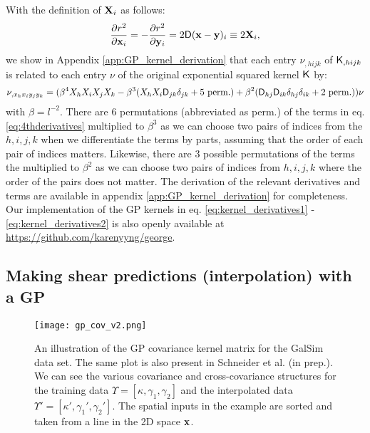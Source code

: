 With the definition of ${\bf X}_i$ as follows:
\begin{equation}
	\frac{\partial r^2}{\partial \mathbf{x}_i} = -\frac{\partial
	r^2}{\partial \mathbf{y}_i} =
	2 \mathsf{D}(\mathbf{x} - \mathbf{y})_i \equiv 2{\bf X}_i,
\end{equation}
we show in Appendix \ref{app:GP_kernel_derivation} 
that each entry $\nu_{,hijk}$ of $\mathsf{K}_{,hijk}$ is
related to each entry $\nu$ of the original exponential squared kernel
$\mathsf{K}$ by:
\begin{equation}
\nu_{,x_h x_i y_j y_k} = (\beta^4 X_h X_i X_j X_k -
\beta^3 (X_h X_i \mathsf{D}_{jk} \delta_{jk} + 5~{\rm perm.}) + \beta^2
(\mathsf{D}_{hj} \mathsf{D}_{ik}\delta_{hj}\delta_{ik} + 2~{\rm perm.})) \nu
\label{eq:4thderivatives}
\end{equation}
with $\beta = l^{-2}$. There are 6 permutations (abbreviated as perm.) of the terms in
eq. \ref{eq:4thderivatives}
multiplied to $\beta^3$ as we can choose two pairs of indices from the $h,i,j,k$ 
when we differentiate the terms by parts, assuming that the order of each
pair of indices matters. 
Likewise, there are 3 possible permutations of
the terms the multiplied to $\beta^2$ as we can choose two pairs of indices from
$h, i, j, k$ where the order of the pairs does not matter.
The derivation of the relevant derivatives and terms are available 
in appendix \ref{app:GP_kernel_derivation} for completeness. 
Our implementation of the GP kernels in eq. \ref{eq:kernel_derivatives1} - 
\ref{eq:kernel_derivatives2} is also openly available at
\href{https://github.com/karenyyng/george}{https://github.com/karenyyng/george}.


\subsection{Making shear predictions (interpolation) with a GP}


\begin{figure}
	\centering
	\texttt{[image: gp\_cov\_v2.png]}
	\caption{An illustration of the GP covariance kernel matrix for the {\sc GalSim} data set.
		The same plot is also present in Schneider et al. (in prep.). We can see the various covariance
		and cross-covariance
		structures for the training data $\Upsilon = [\kappa, \gamma_1, \gamma_2]$
		and the interpolated data $\Upsilon' = [\kappa', \gamma_1', \gamma_2']$.
		The spatial inputs in the example are sorted and taken from a line in the
		2D space $\mathbf{x}$. 
		\label{fig:GP_kernel_vis}}
\end{figure}

